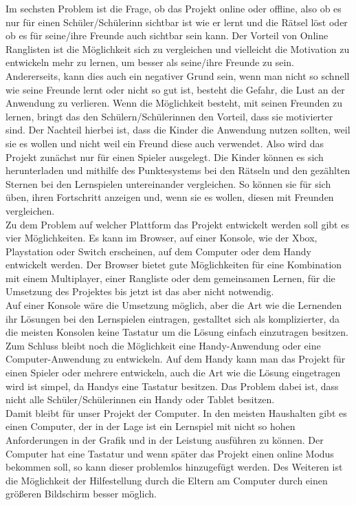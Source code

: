 Im sechsten Problem ist die Frage, ob das Projekt online oder offline, also ob es nur für einen Schüler/Schülerinn sichtbar ist wie er lernt und die Rätsel löst oder ob es für seine/ihre Freunde auch sichtbar sein kann. Der Vorteil von Online Ranglisten ist die Möglichkeit sich zu vergleichen und vielleicht die Motivation zu entwickeln mehr zu lernen, um besser als seine/ihre Freunde zu sein. Andererseits, kann dies auch ein negativer Grund sein, wenn man  nicht so schnell wie seine Freunde lernt oder nicht so gut ist, besteht die Gefahr, die Lust an der Anwendung zu verlieren. Wenn die Möglichkeit besteht, mit seinen Freunden zu lernen, bringt das den Schülern/Schülerinnen den Vorteil, dass sie motivierter sind. Der Nachteil hierbei ist, dass die Kinder die Anwendung nutzen sollten, weil sie es wollen und nicht weil ein Freund diese auch verwendet. Also wird das Projekt zunächst nur für einen Spieler ausgelegt. Die Kinder können es sich herunterladen und mithilfe des Punktesystems bei den Rätseln und den gezählten Sternen bei den Lernspielen untereinander vergleichen. So können sie für sich üben, ihren Fortschritt anzeigen und, wenn sie es wollen, diesen mit Freunden vergleichen.\\
Zu dem Problem auf welcher Plattform das Projekt entwickelt werden soll gibt es vier Möglichkeiten. Es kann im Browser, auf einer Konsole, wie der Xbox, Playstation oder Switch erscheinen, auf dem Computer oder dem Handy entwickelt werden. Der Browser bietet gute Möglichkeiten für eine Kombination mit einem Multiplayer, einer Rangliste oder dem  gemeinsamen Lernen, für die Umsetzung des Projektes bis jetzt ist das aber nicht notwendig.\\
Auf einer Konsole wäre die Umsetzung möglich, aber die Art wie die Lernenden ihr Lösungen bei den Lernspielen eintragen, gestalltet sich als komplizierter, da die meisten Konsolen keine Tastatur um die Lösung einfach einzutragen besitzen. Zum Schluss bleibt noch die Möglichkeit eine Handy-Anwendung oder eine Computer-Anwendung zu entwickeln. Auf dem Handy kann man das Projekt für einen Spieler oder mehrere entwickeln, auch die Art wie die Lösung eingetragen wird ist simpel, da Handys eine Tastatur besitzen. Das Problem dabei ist, dass nicht alle Schüler/Schülerinnen ein Handy oder Tablet besitzen.\\
Damit bleibt für unser Projekt der Computer. In den meisten Haushalten gibt es einen Computer, der in der Lage ist ein Lernspiel mit nicht so hohen Anforderungen in der Grafik und in der Leistung ausführen zu können. Der Computer hat eine Tastatur und wenn später das Projekt einen online Modus bekommen soll, so kann dieser problemlos hinzugefügt werden. Des Weiteren ist die Möglichkeit der Hilfestellung durch die Eltern am Computer durch einen größeren Bildschirm besser möglich.

